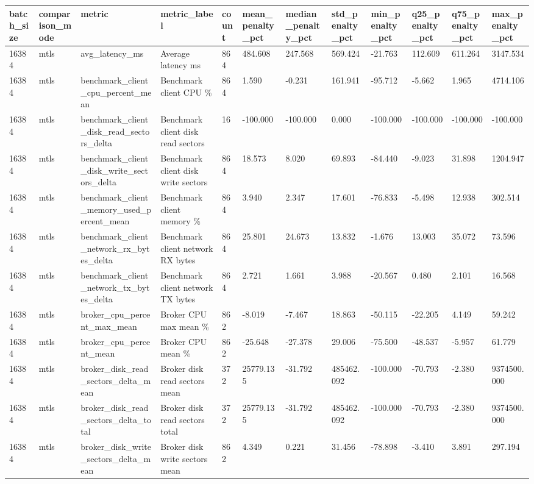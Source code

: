 \begin{longtable}{llllllllllll}
\hline
batch\_size & comparison\_mode & metric & metric\_label & count & mean\_penalty\_pct & median\_penalty\_pct & std\_penalty\_pct & min\_penalty\_pct & q25\_penalty\_pct & q75\_penalty\_pct & max\_penalty\_pct \\
\hline
16384 & mtls & avg\_latency\_ms & Average latency ms & 864 & 484.608 & 247.568 & 569.424 & -21.763 & 112.609 & 611.264 & 3147.534 \\
16384 & mtls & benchmark\_client\_cpu\_percent\_mean & Benchmark client CPU \% & 864 & 1.590 & -0.231 & 161.941 & -95.712 & -5.662 & 1.965 & 4714.106 \\
16384 & mtls & benchmark\_client\_disk\_read\_sectors\_delta & Benchmark client disk read sectors & 16 & -100.000 & -100.000 & 0.000 & -100.000 & -100.000 & -100.000 & -100.000 \\
16384 & mtls & benchmark\_client\_disk\_write\_sectors\_delta & Benchmark client disk write sectors & 864 & 18.573 & 8.020 & 69.893 & -84.440 & -9.023 & 31.898 & 1204.947 \\
16384 & mtls & benchmark\_client\_memory\_used\_percent\_mean & Benchmark client memory \% & 864 & 3.940 & 2.347 & 17.601 & -76.833 & -5.498 & 12.938 & 302.514 \\
16384 & mtls & benchmark\_client\_network\_rx\_bytes\_delta & Benchmark client network RX bytes & 864 & 25.801 & 24.673 & 13.832 & -1.676 & 13.003 & 35.072 & 73.596 \\
16384 & mtls & benchmark\_client\_network\_tx\_bytes\_delta & Benchmark client network TX bytes & 864 & 2.721 & 1.661 & 3.988 & -20.567 & 0.480 & 2.101 & 16.568 \\
16384 & mtls & broker\_cpu\_percent\_max\_mean & Broker CPU max mean \% & 862 & -8.019 & -7.467 & 18.863 & -50.115 & -22.205 & 4.149 & 59.242 \\
16384 & mtls & broker\_cpu\_percent\_mean & Broker CPU mean \% & 862 & -25.648 & -27.378 & 29.006 & -75.500 & -48.537 & -5.957 & 61.779 \\
16384 & mtls & broker\_disk\_read\_sectors\_delta\_mean & Broker disk read sectors mean & 372 & 25779.135 & -31.792 & 485462.092 & -100.000 & -70.793 & -2.380 & 9374500.000 \\
16384 & mtls & broker\_disk\_read\_sectors\_delta\_total & Broker disk read sectors total & 372 & 25779.135 & -31.792 & 485462.092 & -100.000 & -70.793 & -2.380 & 9374500.000 \\
16384 & mtls & broker\_disk\_write\_sectors\_delta\_mean & Broker disk write sectors mean & 862 & 4.349 & 0.221 & 31.456 & -78.898 & -3.410 & 3.891 & 297.194 \\

\end{longtable}
